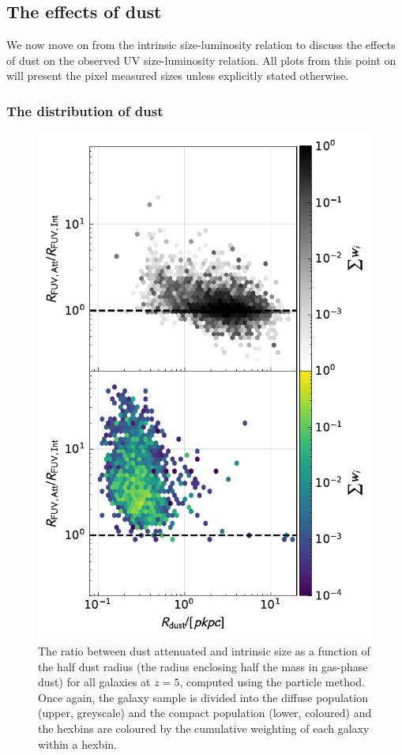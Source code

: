 \subsection{The effects of dust}
\label{sec:dust}

We now move on from the intrinsic size-luminosity relation to discuss the effects of dust on the observed UV size-luminosity relation. All plots from this point on will present the pixel measured sizes unless explicitly stated otherwise.

\subsubsection{The distribution of dust}
\label{sec:dustdist}

\begin{figure}
	\includegraphics[width=\columnwidth]{Figures/HalfDustRadius_hlrratio_FAKE.TH.FUV_5.0_Intrinsic_sim_default.pdf}
    \caption{The ratio between dust attenuated and intrinsic size as a function of the half dust radius (the radius enclosing half the mass in gas-phase dust) for all galaxies at $z=5$, computed using the particle method. Once again, the galaxy sample is divided into the diffuse population (upper, greyscale) and the compact population (lower, coloured) and the hexbins are coloured by the cumulative weighting of each galaxy within a hexbin.}
    \label{fig:HDR}
\end{figure}

